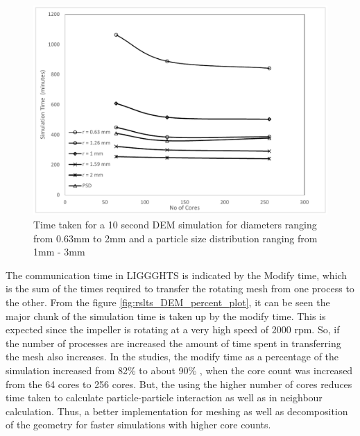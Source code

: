 \documentclass[preprint,11pt,authoryear]{elsarticle}
\begin{document}
\begin{figure}[H]
\centering
\includegraphics[scale=0.7]{rslts_DEM_timing_plots.pdf}
\caption{Time taken for a 10 second DEM simulation for diameters ranging from 0.63mm to 2mm and 
    a particle size distribution ranging from 1mm - 3mm}
\label{fig:rslts_DEM_timing_studies}
\end{figure}
\par The communication time in LIGGGHTS is indicated by the Modify time, which is the sum of the 
times required to transfer the rotating mesh from one process to the other. From the figure 
\ref{fig:rslts_DEM_percent_plot}, it can be seen the major chunk of the simulation time is taken up by 
the modify time. This is expected since the impeller is rotating at a very high speed of 2000 rpm. So, if 
the number of processes are increased the amount of time spent in transferring the mesh also 
increases. In the studies, the modify time as a percentage of the simulation increased from 82\% to 
about 90\% , when the core count was increased from the 64 cores to 256 cores. But, the using the 
higher number of cores reduces time taken to calculate particle-particle interaction as well as in 
neighbour calculation. Thus, a better implementation for meshing as well as decomposition of the 
geometry for faster simulations with higher core counts.
\end{document}
